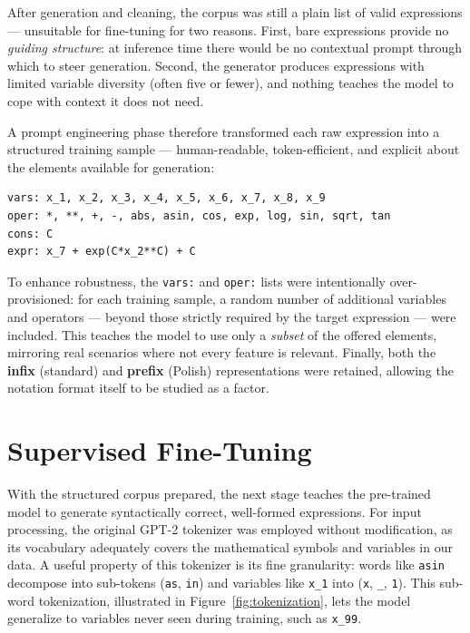 After generation and cleaning, the corpus was still a plain list of valid expressions --- unsuitable for fine-tuning for two reasons. First, bare expressions provide no \emph{guiding structure}: at inference time there would be no contextual prompt through which to steer generation. Second, the generator produces expressions with limited variable diversity (often five or fewer), and nothing teaches the model to cope with context it does not need.

A prompt engineering phase therefore transformed each raw expression into a structured training sample --- human-readable, token-efficient, and explicit about the elements available for generation:

\begin{verbatim}
vars: x_1, x_2, x_3, x_4, x_5, x_6, x_7, x_8, x_9
oper: *, **, +, -, abs, asin, cos, exp, log, sin, sqrt, tan
cons: C
expr: x_7 + exp(C*x_2**C) + C
\end{verbatim}

To enhance robustness, the \texttt{vars:} and \texttt{oper:} lists were intentionally over-provisioned: for each training sample, a random number of additional variables and operators --- beyond those strictly required by the target expression --- were included. This teaches the model to use only a \emph{subset} of the offered elements, mirroring real scenarios where not every feature is relevant. Finally, both the \textbf{infix} (standard) and \textbf{prefix} (Polish) representations were retained, allowing the notation format itself to be studied as a factor.

\section{Supervised Fine-Tuning}
\label{sec:sft_setup}

With the structured corpus prepared, the next stage teaches the pre-trained model to generate syntactically correct, well-formed expressions. For input processing, the original GPT-2 tokenizer was employed without modification, as its vocabulary adequately covers the mathematical symbols and variables in our data. A useful property of this tokenizer is its fine granularity: words like \texttt{asin} decompose into sub-tokens (\texttt{as}, \texttt{in}) and variables like \texttt{x\_1} into (\texttt{x}, \texttt{\_}, \texttt{1}). This sub-word tokenization, illustrated in Figure~\ref{fig:tokenization}, lets the model generalize to variables never seen during training, such as \texttt{x\_99}.

